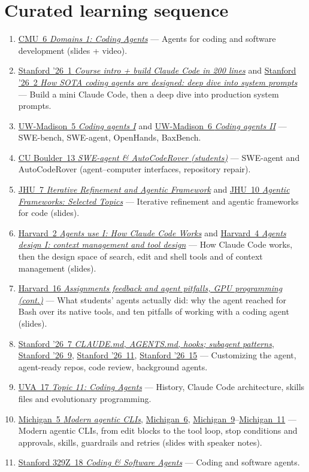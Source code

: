 \documentclass[10pt,oneside]{report}
\begin{document}
\section{Curated learning sequence}
\begin{enumerate}
\item \hyperlink{lec-CMU-6}{CMU~6 \emph{Domains 1: Coding Agents}} --- Agents for coding and software development (slides + video).
\item \hyperlink{lec-STAN26-1}{Stanford '26~1 \emph{Course intro + build Claude Code in 200 lines}} and \hyperlink{lec-STAN26-2}{Stanford '26~2 \emph{How SOTA coding agents are designed: deep dive into system prompts}} --- Build a mini Claude Code, then a deep dive into production system prompts.
\item \hyperlink{lec-UW-5}{UW-Madison~5 \emph{Coding agents I}} and \hyperlink{lec-UW-6}{UW-Madison~6 \emph{Coding agents II}} --- SWE-bench, SWE-agent, OpenHands, BaxBench.
\item \hyperlink{lec-CU-13}{CU Boulder~13 \emph{SWE-agent \& AutoCodeRover (students)}} --- SWE-agent and AutoCodeRover (agent--computer interfaces, repository repair).
\item \hyperlink{lec-JHU-7}{JHU~7 \emph{Iterative Refinement and Agentic Framework}} and \hyperlink{lec-JHU-10}{JHU~10 \emph{Agentic Frameworks: Selected Topics}} --- Iterative refinement and agentic frameworks for code (slides).
\item \hyperlink{lec-HARV-2}{Harvard~2 \emph{Agents use I: How Claude Code Works}} and \hyperlink{lec-HARV-4}{Harvard~4 \emph{Agents design I: context management and tool design}} --- How Claude Code works, then the design space of search, edit and shell tools and of context management (slides).
\item \hyperlink{lec-HARV-16}{Harvard~16 \emph{Assignments feedback and agent pitfalls, GPU programming (cont.)}} --- What students' agents actually did: why the agent reached for Bash over its native tools, and ten pitfalls of working with a coding agent (slides).
\item \hyperlink{lec-STAN26-7}{Stanford '26~7 \emph{CLAUDE.md, AGENTS.md, hooks; subagent patterns}}, \hyperlink{lec-STAN26-9}{Stanford '26~9}, \hyperlink{lec-STAN26-11}{Stanford '26~11}, \hyperlink{lec-STAN26-15}{Stanford '26~15} --- Customizing the agent, agent-ready repos, code review, background agents.
\item \hyperlink{lec-UVA-17}{UVA~17 \emph{Topic 11: Coding Agents}} --- History, Claude Code architecture, skills files and evolutionary programming.
\item \hyperlink{lec-UMICH-5}{Michigan~5 \emph{Modern agentic CLIs}}, \hyperlink{lec-UMICH-6}{Michigan~6}, \hyperlink{lec-UMICH-9}{Michigan~9}--\hyperlink{lec-UMICH-11}{Michigan~11} --- Modern agentic CLIs, from edit blocks to the tool loop, stop conditions and approvals, skills, guardrails and retries (slides with speaker notes).
\item \hyperlink{lec-S329Z-18}{Stanford 329Z~18 \emph{Coding \& Software Agents}} --- Coding and software agents.
\end{enumerate}
\end{document}
